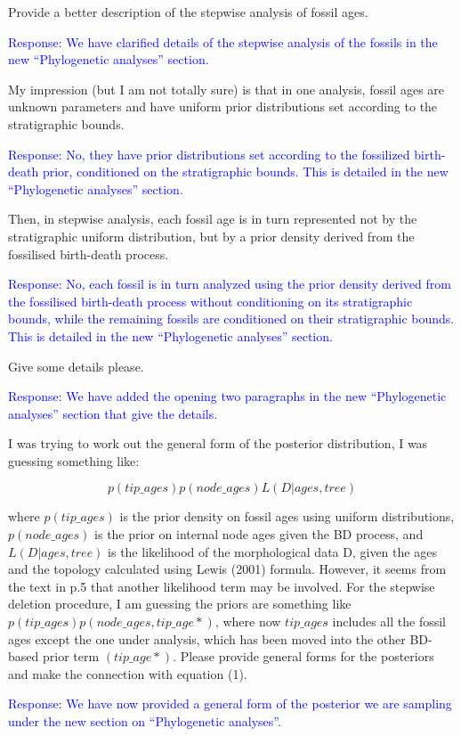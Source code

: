 \documentclass[11pt]{article}
\newcommand{\response}[1]{\medskip{}\textcolor{blue}{{Response: #1}}\medskip{}}
\begin{document}
Provide a better description of the stepwise analysis of fossil ages. 

\response{We have clarified details of the stepwise analysis of the fossils in the new ``Phylogenetic analyses'' section.}

My impression (but I am not totally sure) is that in one analysis, fossil ages are unknown parameters and have uniform prior distributions set according to the stratigraphic bounds. 

\response{No, they have prior distributions set according to the fossilized birth-death prior, conditioned on the stratigraphic bounds. This is detailed in the new ``Phylogenetic analyses'' section. }

Then, in stepwise analysis, each fossil age is in turn represented not by the stratigraphic uniform distribution, but by a prior density derived from the fossilised birth-death process.

\response{No, each fossil is in turn analyzed using the prior density derived from the fossilised birth-death process without conditioning on its stratigraphic bounds, while the remaining fossils are conditioned on their stratigraphic bounds. This is detailed in the new ``Phylogenetic analyses'' section. }

 Give some details please.
 
 \response{We have added the opening two paragraphs in the new ``Phylogenetic analyses'' section that give the details.}
 
  I was trying to work out the general form of the posterior distribution, I was guessing something like:

$$p(tip\_ages) p(node\_ages) L(D|ages,tree)$$

where $p(tip\_ages)$ is the prior density on fossil ages using uniform distributions, $p(node\_ages)$ is the prior on internal node ages given the BD process, and $L(D|ages,tree)$ is the likelihood of the morphological data D, given the ages and the topology calculated using Lewis (2001) formula. However, it seems from the text in p.5 that another likelihood term may be involved. For the stepwise deletion procedure, I am guessing the priors are something like $p(tip\_ages\hat{}) p(node\_ages, tip\_age*)$, where now $tip\_ages\hat{}$ includes all the fossil ages except the one under analysis, which has been moved into the other BD-based prior term $(tip\_age*)$. Please provide general forms for the posteriors and make the connection with equation (1).

\response{We have now provided a general form of the posterior we are sampling under the new section on ``Phylogenetic analyses''. }
\end{document}
